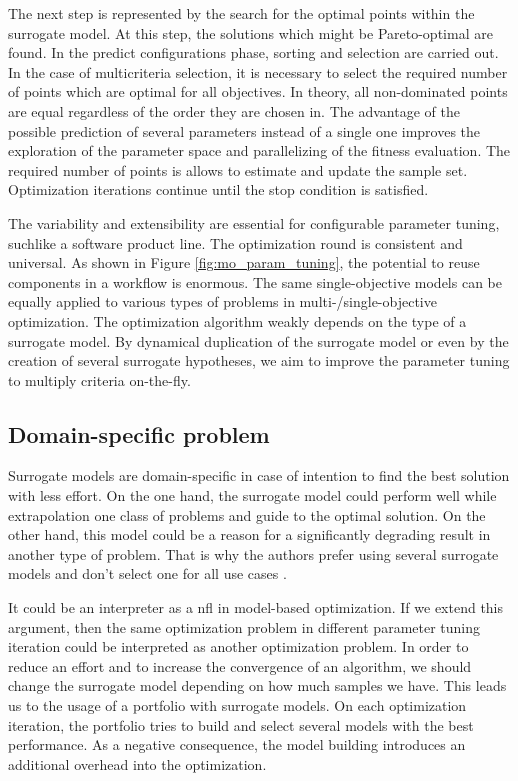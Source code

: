             The next step is represented by the search for the optimal points within the surrogate model. At this step, the solutions which might be Pareto-optimal are found. In the predict configurations phase, sorting and selection are carried out. In the case of multicriteria selection, it is necessary to select the required number of points which are optimal for all objectives. In theory, all non-dominated points are equal regardless of the order they are chosen in. The advantage of the possible prediction of several parameters instead of a single one improves the exploration of the parameter space and parallelizing of the fitness evaluation. The required number of points is allows to estimate and update the sample set. Optimization iterations continue until the stop condition is satisfied.
    
            The variability and extensibility are essential for configurable parameter tuning, suchlike a software product line. The optimization round is consistent and universal. As shown in Figure \ref{fig:mo_param_tuning}, the potential to reuse components in a workflow is enormous. The same single-objective models can be equally applied to various types of problems in multi-/single-objective optimization. The optimization algorithm weakly depends on the type of a surrogate model. By dynamical duplication of the surrogate model or even by the creation of several surrogate hypotheses, we aim to improve the parameter tuning to multiply criteria on-the-fly.

        \subsection{Domain-specific problem}
        Surrogate models are domain-specific in case of intention to find the best solution with less effort. On the one hand, the surrogate model could perform well while extrapolation one class of problems and guide to the optimal solution. On the other hand, this model could be a reason for a significantly degrading result in another type of problem. That is why the authors prefer using several surrogate models and don't select one for all use cases \cite{SoftSurvey}.

        It could be an interpreter as a \Gls{nfl} in model-based optimization. If we extend this argument, then the same optimization problem in different parameter tuning iteration could be interpreted as another optimization problem. In order to reduce an effort and to increase the convergence of an algorithm, we should change the surrogate model depending on how much samples we have. 
        This leads us to the usage of a portfolio with surrogate models. On each optimization iteration, the portfolio tries to build and select several models with the best performance.  As a negative consequence, the model building introduces an additional overhead into the optimization.


